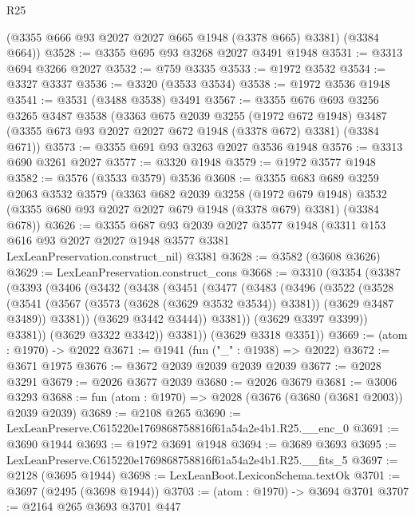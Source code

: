 \begin{lexlean}{R25}
\begin{coremodule}
      (@3355 @666 @93 @2027 @2027 @665 @1948 (@3378 @665) @3381)
      (@3384 @664))
@3528 := @3355 @695 @93 @3268 @2027 @3491 @1948
@3531 := @3313 @694 @3266 @2027
@3532 := @759 @3335
@3533 := @1972 @3532
@3534 := @3327 @3337
@3536 := @3320 (@3533 @3534)
@3538 := @1972 @3536 @1948
@3541 := @3531 (@3488 @3538) @3491
@3567 := @3355
    @676
    @693
    @3256
    @3265
    @3487
    @3538
    (@3363
      @675
      @2039
      @3255
      (@1972 @672 @1948)
      @3487
      (@3355 @673 @93 @2027 @2027 @672 @1948 (@3378 @672) @3381)
      (@3384 @671))
@3573 := @3355 @691 @93 @3263 @2027 @3536 @1948
@3576 := @3313 @690 @3261 @2027
@3577 := @3320 @1948
@3579 := @1972 @3577 @1948
@3582 := @3576 (@3533 @3579) @3536
@3608 := @3355
    @683
    @689
    @3259
    @2063
    @3532
    @3579
    (@3363
      @682
      @2039
      @3258
      (@1972 @679 @1948)
      @3532
      (@3355 @680 @93 @2027 @2027 @679 @1948 (@3378 @679) @3381)
      (@3384 @678))
@3626 := @3355
    @687
    @93
    @2039
    @2027
    @3577
    @1948
    (@3311 @153 @616 @93 @2027 @2027 @1948 @3577 @3381 LexLeanPreservation.construct_nil)
    @3381
@3628 := @3582 (@3608 @3626)
@3629 := LexLeanPreservation.construct_cons
@3668 := @3310
    (@3354
      (@3387
        (@3393
          (@3406
            (@3432
              (@3438
                (@3451
                  (@3477
                    (@3483
                      (@3496
                        (@3522
                          (@3528
                            (@3541
                              (@3567 (@3573 (@3628 (@3629 @3532 @3534)) @3381))
                              (@3629 @3487 @3489))
                            @3381))
                        (@3629 @3442 @3444))
                      @3381))
                  (@3629 @3397 @3399))
                @3381))
            (@3629 @3322 @3342))
          @3381))
      (@3629 @3318 @3351))
@3669 := (atom : @1970) -> @2022
@3671 := @1941 (fun ("_" : @1938) => @2022)
@3672 := @3671 @1975
@3676 := @3672 @2039 @2039 @2039 @2039
@3677 := @2028 @3291
@3679 := @2026 @3677 @2039
@3680 := @2026 @3679
@3681 := @3006 @3293
@3688 := fun (atom : @1970) => @2028 (@3676 (@3680 (@3681 @2003)) @2039 @2039)
@3689 := @2108 @265
@3690 := LexLeanPreserve.C615220e1769868758816f61a54a2e4b1.R25.__enc_0
@3691 := @3690 @1944
@3693 := @1972 @3691 @1948
@3694 := @3689 @3693
@3695 := LexLeanPreserve.C615220e1769868758816f61a54a2e4b1.R25.__fits_5
@3697 := @2128 (@3695 @1944)
@3698 := LexLeanBoot.LexiconSchema.textOk
@3701 := @3697 (@2495 (@3698 @1944))
@3703 := (atom : @1970) -> @3694 @3701
@3707 := @2164 @265 @3693 @3701 @447

\end{coremodule}
\end{lexlean}
